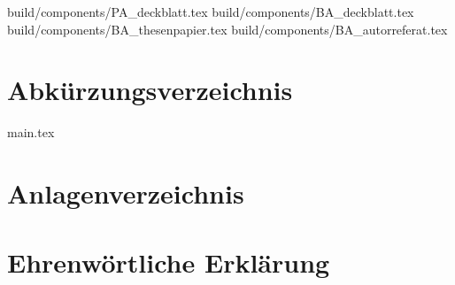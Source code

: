 \documentclass	[a4paper, 12pt]{article}
\title{{\LARGE \textbf{\CTITLE}}}
\author			{}
\date			{}
\begin{document}
\ifnum{}
				{build/components/PA_deckblatt.tex}
	\else
				{build/components/BA_deckblatt.tex}
				{build/components/BA_thesenpapier.tex}
				{build/components/BA_autorreferat.tex}
\fi


 \setcounter{page}{1}
\tableofcontents{\fancyfoot{}}
\cleardoublepage

\conditionalLoF

\conditionalLoT

\section*{Abkürzungsverzeichnis}
\begin{acronym}[DHGE]\itemsep0pt
	
\end{acronym}
\cleardoublepage


			{main.tex}
\cleardoublepage

 \setcounter{page}{\thesavepage}
\printbibliography[title=Literaturverzeichnis]
\cleardoublepage

\section*{Anlagenverzeichnis}

\cleardoublepage

\pagestyle{empty}
\section*{Ehrenwörtliche Erklärung}

\end{document}

